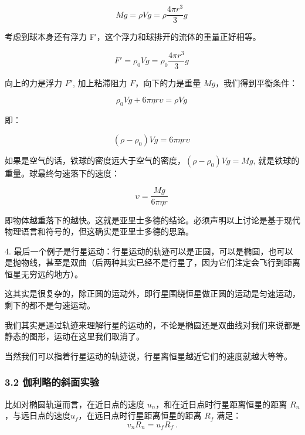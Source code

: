 \begin{equation}
M g = \rho V g= \rho \frac{4 \pi r^3 }{3}g~
\end{equation}

考虑到球本身还有浮⼒ F′，这个浮⼒和球排开的流体的重量正好相等。

\begin{equation}
F' = \rho_0 V g = \rho_0\frac{4 \pi r^3 }{3}g ~
\end{equation}

向上的⼒是浮⼒ $F'$, 加上粘滞阻⼒ $F$，向下的⼒是重量 $Mg$，我们得到平衡条件：

\begin{equation}
\rho_0 V g+6\pi\eta r \upsilon = \rho V g ~
\end{equation}

即：

\begin{equation}
(\rho-\rho_0)V g=6\pi\eta r \upsilon ~
\end{equation}

如果是空⽓的话，铁球的密度远⼤于空⽓的密度，$(\rho-\rho_0)V g=M g$, 就是铁球的重量。球最终匀速落下的速度：


\begin{equation}
\upsilon=\frac{M g}{6\pi\eta r }~
\end{equation}


即物体越重落下的越快。这就是亚里⼠多德的结论。必须声明以上讨论是基于现代物理语⾔和符号的，但这确实是亚里⼠多德的思路。

4. 最后⼀个例⼦是⾏星运动：⾏星运动的轨迹可以是正圆，可以是椭圆，也可以是抛物线，甚⾄是双曲（后两种其实已经不是⾏星了，因为它们注定会飞⾏到距离恒星⽆穷远的地⽅）。

这其实是很复杂的，除正圆的运动外，即⾏星围绕恒星做正圆的运动是匀速运动，剩下的都不是匀速运动。

我们其实是通过轨迹来理解⾏星的运动的，不论是椭圆还是双曲线对我们来说都是静态的图形，运动在这里我们取消了。

当然我们可以指着⾏星运动的轨迹说，⾏星离恒星越近它们的速度就越⼤等等。

\subsubsection{3.2 伽利略的斜面实验}

比如对椭圆轨道⽽⾔，在近日点的速度 $u_n$，和在近日点时⾏星距离恒星的距离 $R_n$，与远日点的速度$u_f$，在远日点时⾏星距离恒星的距离 $R_f$ 满⾜：
\begin{equation}
v_nR_n = u_fR_f~.
\end{equation}

